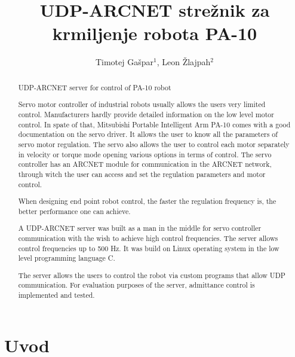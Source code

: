 \documentclass[a4paper]{article}
\begin{document}
\title{UDP-ARCNET strežnik za krmiljenje robota PA-10}

\author{Timotej Gašpar$^{1}$, Leon Žlajpah$^{2}$} %



\maketitle


\begin{abstract}{UDP-ARCNET server for control of PA-10 robot}

Servo motor controller of industrial robots usually allows the users very limited control. Manufacturers hardly provide detailed information on the low level motor control. In spate of that, Mitsubishi Portable Intelligent Arm PA-10 comes with a good documentation on the servo driver. It allows the user to know all the parameters of servo motor regulation. The servo also allows the user to control each motor separately in velocity or torque mode opening various options in terms of control. The servo controller has an ARCNET module for communication in the ARCNET network, through witch the user can access and set the regulation parameters and motor control.

When designing end point robot control, the faster the regulation frequency is, the better performance one can achieve. 

A UDP-ARCNET server was built as a man in the middle for servo controller communication with the wish to achieve high control frequencies. The server allows control frequencies up to 500 Hz. It was build on Linux operating system in the low level programming language C.

The server allows the users to control the robot via custom programs that allow UDP communication. For evaluation purposes of the server, admittance control is implemented and tested.

\end{abstract}



\section{Uvod}
\end{document}
